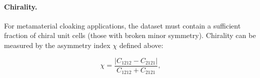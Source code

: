 \documentclass{article}
\begin{document}
\paragraph{Chirality.}
For metamaterial cloaking applications, the dataset must contain a sufficient
fraction of chiral unit cells (those with broken minor symmetry).  Chirality
can be measured by the asymmetry index $\chi$ defined above:

\begin{equation}
    \chi = \frac{|C_{1212} - C_{2121}|}{C_{1212} + C_{2121}},
\end{equation}







\end{document}
